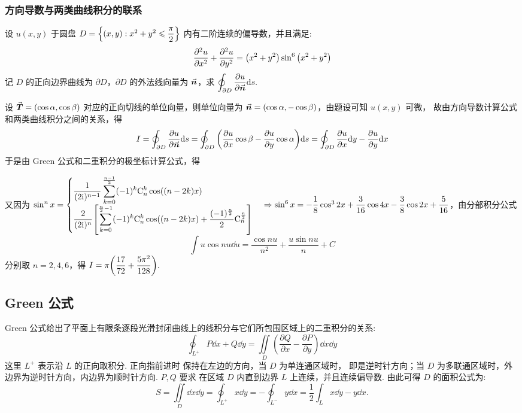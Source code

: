 \subsubsection{方向导数与两类曲线积分的联系}

\begin{example}
    设 $u(x,y)$ 于圆盘 $D=\qty{(x,y):x^2+y^2\leqslant \dfrac{\pi}{2}}$ 内有二阶连续的偏导数，并且满足:
    $$\pdv[2]{u}{x}+\pdv[2]{u}{y}=\qty(x^2+y^2)\sin^6\qty(x^2+y^2)$$
    记 $D$ 的正向边界曲线为 $\partial D$，$\partial D$ 的外法线向量为 $\va*{n}$，求 $\displaystyle \oint_{\partial D}\pdv{u}{\va*{n}}\dd s.$
\end{example}
\begin{solution}
    设 $\va*{T}=(\cos\alpha,\cos\beta)$ 对应的正向切线的单位向量，则单位向量为 $\va*{n}=(\cos\alpha,-\cos\beta)$，由题设可知 $u(x,y)$ 可微，
    故由方向导数计算公式和两类曲线积分之间的关系，得
    $$I=\oint_{\partial D}\pdv{u}{\va*{n}}\dd s=\oint_{\partial D}\qty(\pdv{u}{x}\cos \beta-\pdv{u}{y}\cos \alpha)\dd s=\oint_{\partial D}\pdv{u}{x}\dd y-\pdv{u}{y}\dd x$$
    于是由 Green 公式和二重积分的极坐标计算公式，得
    又因为 $\sin^nx=\begin{cases}
            \displaystyle \dfrac{1}{(2\mathrm{i})^{n-1}}\sum_{k=0}^{\frac{n-1}{2}}(-1)^k\mathrm{C}_n^k\cos((n-2k)x) \\
            \displaystyle \dfrac{2}{(2\mathrm{i})^n}\qty[\sum_{k=0}^{\frac{n}{2}-1}(-1)^k\mathrm{C}_n^k\cos((n-2k)x)+\dfrac{(-1)^{\frac{n}{2}}}{2}\mathrm{C}_n^{\frac{n}{2}}]
        \end{cases}\Rightarrow \sin^6x=-\dfrac{1}{8}\cos^32x+\dfrac{3}{16}\cos 4x-\dfrac{3}{8}\cos 2x+\dfrac{5}{16}$，由分部积分公式
    $$\int u\cos nu\dd u=\dfrac{\cos nu}{n^2}+\dfrac{u\sin nu}{n}+C$$
    分别取 $n=2,4,6$，得 $\displaystyle I=\pi\qty(\dfrac{17}{72}+\dfrac{5\pi^2}{128}).$
\end{solution}

\subsection{Green 公式}

\begin{theorem}[Green 公式]
    Green 公式给出了平面上有限条逐段光滑封闭曲线上的线积分与它们所包围区域上的二重积分的关系:
    $$\oint_{L^+}P\dd x+Q\dd y=\iint\limits_D\left(\frac{\partial Q}{\partial x}-\frac{\partial P}{\partial y}\right)\dd x\dd y$$
    这里 $L^+$ 表示沿 $L$ 的正向取积分. 正向指前进时  保持在左边的方向，当 $D$ 为单连通区域时，
    即是逆时针方向；当 $D$ 为多联通区域时，外边界为逆时针方向，内边界为顺时针方向. $P,Q$ 要求
    在区域 $D$ 内直到边界 $L$ 上连续，并且连续偏导数. 由此可得 $D$ 的面积公式为:
    $$S=\iint\limits_D\dd x\dd y=\oint_{L^+}x\dd y=-\oint_{L^-}y\dd x=\frac{1}{2}\int_Lx\dd y-y\dd x.$$
\end{theorem}


